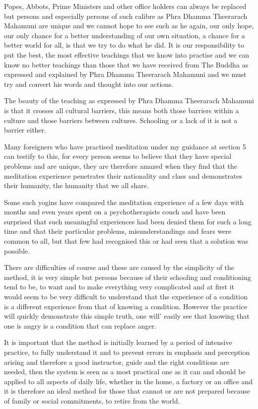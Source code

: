 \documentclass[a5paper,10pt,english]{book}
\begin{document}
\sphinxAtStartPar
Popes, Abbots, Prime Ministers and other office holders can always be replaced but persons and especially persons of such calibre as Phra Dhamma Theerarach Mahamuni are unique and we cannot hope to see such as he again, our only hope, our only chance for a better understanding of our own situation, a chance for a better world for all, is that we try to do what he did. It is our responsibility to put the best, the most effective teachings that we know into practise and we can know no better teachings than those that we have received from The Buddha as expressed and explained by Phra Dhamma Theerarach Mahamuni and we must try and convert his words and thought into our actions.

\sphinxAtStartPar
The beauty of the teaching as expressed by Phra Dhamma Theerarach Mahamuni is that it crosses all cultural barriers, this means both those barriers within a culture and those barriers between cultures. Schooling or a lack of it is not a barrier either.

\sphinxAtStartPar
Many foreigners who have practised meditation under my guidance at section 5 can testify to this, for every person seems to believe that they have special problems and are unique, they are therefore amazed when they find that the meditation experience penetrates their nationality and class and demonstrates their humanity, the humanity that we all share.

\sphinxAtStartPar
Some such yogins have compared the meditation experience of a few days with months and even years spent on a psychotherapists couch and have been surprised that such meaningful experiences had been denied them for such a long time and that their particular problems, misunderstandings and fears were common to all, but that few had recognised this or had seen that a solution was possible.

\sphinxAtStartPar
There are difficulties of course and these are caused by the simplicity of the method, it is very simple but persons because of their schooling and conditioning tend to be, to want and to make everything very complicated and at first it would seem to be very difficult to understand that the experience of a condition is a different experience from that of knowing a condition. However the practice will quickly demonstrate this simple truth, one will’ easily see that knowing that one is angry is a condition that can replace anger.

\sphinxAtStartPar
It is important that the method is initially learned by a period of intensive practice, to fully understand it and to prevent errors in emphasis and perception arising and therefore a good instructor, guide and the right conditions are needed, then the system is seen as a most practical one as it can and should be applied to all aspects of daily life, whether in the home, a factory or an office and it is therefore an ideal method for those that cannot or are not prepared because of family or social commitments, to retire from the world.
\end{document}

